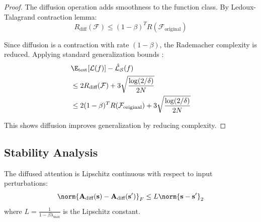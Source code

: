 \documentclass[12pt,en]{elegantpaper}
\begin{document}
\begin{proof}
The diffusion operation adds smoothness to the function class. By Ledoux-Talagrand contraction lemma:
\begin{equation}
    R_{\text{diff}}(\mathcal{F}) \leq (1-\beta)^T R(\mathcal{F}_{\text{original}})
\end{equation}

Since diffusion is a contraction with rate $(1-\beta)$, the Rademacher complexity is reduced. Applying standard generalization bounds \citep{mohri2018foundations}:
\begin{align}
    &\E_{\text{test}}[\mathcal{L}(f)] - \hat{\mathcal{L}}_{\mathcal{S}}(f) \\
    &\leq 2 R_{\text{diff}}(\mathcal{F}) + 3\sqrt{\frac{\log(2/\delta)}{2N}} \\
    &\leq 2(1-\beta)^T R(\mathcal{F}_{\text{original}}) + 3\sqrt{\frac{\log(2/\delta)}{2N}}
\end{align}

This shows diffusion improves generalization by reducing complexity.
\end{proof}

\subsection{Stability Analysis}

\begin{proposition}
The diffused attention is Lipschitz continuous with respect to input perturbations:
\begin{equation}
    \norm{\mathbf{A}_{\text{diff}}(\mathbf{s}) - \mathbf{A}_{\text{diff}}(\mathbf{s}')}_F \leq L \norm{\mathbf{s} - \mathbf{s}'}_2
\end{equation}
where $L = \frac{1}{1-\beta\lambda_{\max}}$ is the Lipschitz constant.
\end{proposition}
\end{document}

